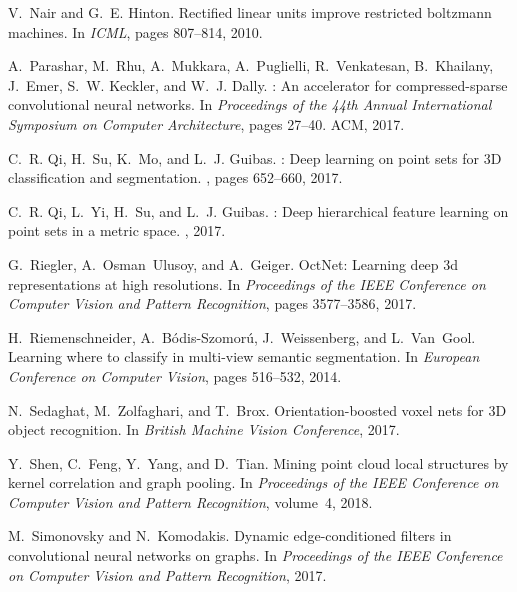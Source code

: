 \documentclass[10pt,twocolumn,letterpaper]{article}
\begin{document}
{\begin{thebibliography}{10}
V.~Nair and G.~E. Hinton.
\newblock Rectified linear units improve restricted boltzmann machines.
\newblock In {\em ICML}, pages 807--814, 2010.

A.~Parashar, M.~Rhu, A.~Mukkara, A.~Puglielli, R.~Venkatesan, B.~Khailany,
  J.~Emer, S.~W. Keckler, and W.~J. Dally.
: An accelerator for compressed-sparse convolutional neural
  networks.
\newblock In {\em Proceedings of the 44th Annual International Symposium on
  Computer Architecture}, pages 27--40. ACM, 2017.

C.~R. Qi, H.~Su, K.~Mo, and L.~J. Guibas.
: Deep learning on point sets for {3D} classification and
  segmentation.
, pages 652--660, 2017.

C.~R. Qi, L.~Yi, H.~Su, and L.~J. Guibas.
: Deep hierarchical feature learning on point sets in a
  metric space.
, 2017.

G.~Riegler, A.~Osman~Ulusoy, and A.~Geiger.
\newblock Oct{N}et: Learning deep 3d representations at high resolutions.
\newblock In {\em Proceedings of the IEEE Conference on Computer Vision and
  Pattern Recognition}, pages 3577--3586, 2017.

H.~Riemenschneider, A.~B{\'o}dis-Szomor{\'u}, J.~Weissenberg, and L.~Van~Gool.
\newblock Learning where to classify in multi-view semantic segmentation.
\newblock In {\em European Conference on Computer Vision}, pages 516--532,
  2014.

N.~Sedaghat, M.~Zolfaghari, and T.~Brox.
\newblock Orientation-boosted voxel nets for {3D} object recognition.
\newblock In {\em British Machine Vision Conference}, 2017.

Y.~Shen, C.~Feng, Y.~Yang, and D.~Tian.
\newblock Mining point cloud local structures by kernel correlation and graph
  pooling.
\newblock In {\em Proceedings of the IEEE Conference on Computer Vision and
  Pattern Recognition}, volume~4, 2018.

M.~Simonovsky and N.~Komodakis.
\newblock Dynamic edge-conditioned filters in convolutional neural networks on
  graphs.
\newblock In {\em Proceedings of the IEEE Conference on Computer Vision and
  Pattern Recognition}, 2017.


\end{thebibliography}}
\end{document}
